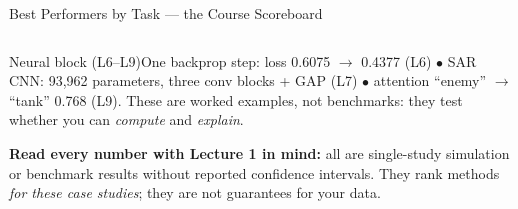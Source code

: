 \documentclass[aspectratio=169,10pt,t]{beamer}
\begin{document}
\begin{frame}{Best Performers by Task --- the Course Scoreboard}
\begin{columns}[T]
\end{columns}
\begin{cbox}[violet]{Neural block (L6--L9)}\scriptsize One backprop step: loss 0.6075 $\to$ 0.4377 (L6) $\bullet$ SAR CNN: 93,962 parameters, three conv blocks + GAP (L7) $\bullet$ attention ``enemy'' $\to$ ``tank'' 0.768 (L9). These are worked examples, not benchmarks: they test whether you can \emph{compute} and \emph{explain}.\end{cbox}
\begin{ibox}\scriptsize\textbf{Read every number with Lecture 1 in mind:} all are single-study simulation or benchmark results without reported confidence intervals. They rank methods \emph{for these case studies}; they are not guarantees for your data.\end{ibox}
\end{frame}
\end{document}
